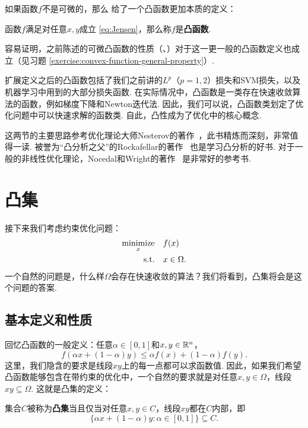 如果函数$f$不是可微的，那么 给了一个凸函数更加本质的定义：
\begin{definition}[凸函数]
    函数$f$满足对任意$x,y$成立 \eqref{eq:Jensen}，那么称$f$是\textbf{凸函数}.
\end{definition}

容易证明，之前陈述的可微凸函数的性质（、）对于这一更一般的凸函数定义也成立（见习题 \ref{exercise:convex-function-general-property}）.

扩展定义之后的凸函数包括了我们之前讲的$L^p$（$p=1,2$）损失和SVM损失，以及机器学习中用到的大部分损失函数. 在实际情况中，凸函数是一类存在快速收敛算法的函数，例如梯度下降和Newton迭代法. 因此，我们可以说，凸函数类划定了优化问题中可以快速求解的函数类. 自此，凸性成为了优化中的核心概念. 


\begin{remark}
    这两节的主要思路参考优化理论大师Nesterov的著作~\cite{nesterovIntroductoryLecturesConvex2004}，此书精炼而深刻，非常值得一读. 被誉为“凸分析之父”的Rockafellar的著作~\cite{rockafellarConvexAnalysis1970} 也是学习凸分析的好书. 对于一般的非线性优化理论，Nocedal和Wright的著作~\cite{NumericalOptimization2006} 是非常好的参考书.
\end{remark}

\section{凸集}
接下来我们考虑约束优化问题：
\begin{align*}
    \operatorname*{minimize}_x &\quad f(x)\\
    \text{s.t.}&\quad x\in \Omega.
\end{align*}
一个自然的问题是，什么样$\Omega$会存在快速收敛的算法？我们将看到，凸集将会是这个问题的答案.

\subsection{基本定义和性质}
回忆凸函数的一般定义：任意$\alpha\in[0,1]$和$x,y\in\mathbb{R}^n$，
    \[
        f(\alpha x+(1-\alpha) y)\leq \alpha f(x)+(1-\alpha) f(y).
    \]
这里，我们隐含的要求是线段$xy$上的每一点都可以求函数值. 因此，如果我们希望凸函数能够包含在带约束的优化中，一个自然的要求就是对任意$x,y\in \Omega$，线段$xy\subseteq \Omega$. 这就是凸集的定义：

\begin{definition}[凸集]
集合$C$被称为\textbf{凸集}当且仅当对任意$x,y\in C$，线段$xy$都在$C$内部，即
\[\{\alpha x+(1-\alpha)y:\alpha\in [0,1]\}\subseteq C.\]
\end{definition}


